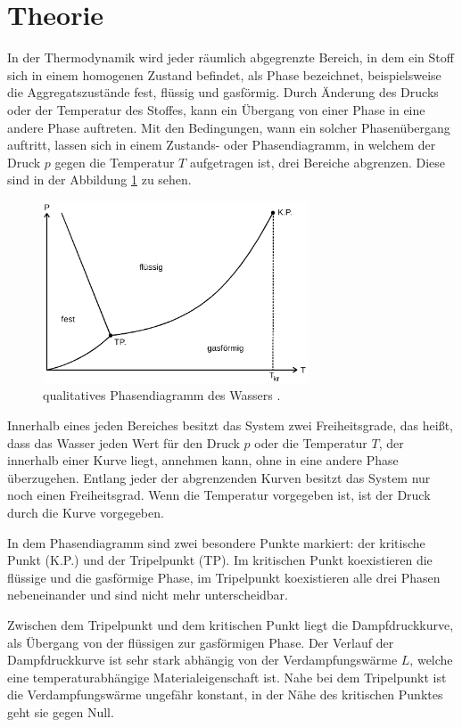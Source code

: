 \section{Theorie}
\label{sec:Theorie}
In der Thermodynamik wird jeder räumlich abgegrenzte Bereich, in dem ein Stoff
sich in einem homogenen Zustand befindet, als Phase bezeichnet, beispielsweise
die Aggregatszustände fest, flüssig und gasförmig. Durch Änderung des Drucks oder
der Temperatur des Stoffes, kann ein Übergang von einer Phase in eine andere
Phase auftreten. Mit den Bedingungen, wann ein solcher Phasenübergang auftritt,
lassen sich in einem Zustands- oder Phasendiagramm, in welchem der Druck $p$
gegen die Temperatur $T$ aufgetragen ist, drei Bereiche abgrenzen. Diese sind in
der Abbildung \ref{fig:phasendiagramm} zu sehen.
\begin{figure}[H]
  \centering
  \includegraphics[width=0.7\textwidth]{phasendiagramm.png}
  \caption{qualitatives Phasendiagramm des Wassers \cite{sample}.}
  \label{fig:phasendiagramm}
\end{figure}
\noindent Innerhalb eines jeden Bereiches besitzt das System zwei Freiheitsgrade, das heißt,
dass das Wasser jeden Wert für den Druck $p$ oder die Temperatur $T$, der innerhalb
einer Kurve liegt, annehmen kann, ohne in eine andere Phase überzugehen. Entlang
jeder der abgrenzenden Kurven besitzt das System nur noch einen Freiheitsgrad.
Wenn die Temperatur vorgegeben ist, ist der Druck durch die Kurve vorgegeben.

In dem Phasendiagramm sind zwei besondere Punkte markiert: der kritische Punkt
(K.P.) und der Tripelpunkt (TP). Im kritischen Punkt koexistieren die flüssige
und die gasförmige Phase, im Tripelpunkt koexistieren alle drei Phasen nebeneinander
und sind nicht mehr unterscheidbar.

Zwischen dem Tripelpunkt und dem kritischen Punkt liegt die Dampfdruckkurve, als
Übergang von der flüssigen zur gasförmigen Phase. Der Verlauf der Dampfdruckkurve
ist sehr stark abhängig von der Verdampfungswärme $L$, welche eine temperaturabhängige
Materialeigenschaft ist. Nahe bei dem Tripelpunkt ist die Verdampfungswärme
ungefähr konstant, in der Nähe des kritischen Punktes geht sie gegen Null.

